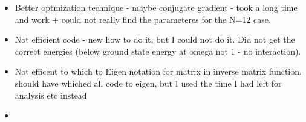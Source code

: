 \begin{itemize}
\item Better optmization technique - maybe conjugate gradient - took a long time and work + could not really find the parameteres for the N=12 case. 
\item Not efficient code - new how to do it, but I could not do it. Did not get the correct energies (below ground state energy at omega not 1 - no interaction).
\item Not efficent to which to Eigen notation for matrix in inverse matrix function, should have whiched all code to eigen, but I used the time I had left for analysis etc instead
\item 
\end{itemize}


